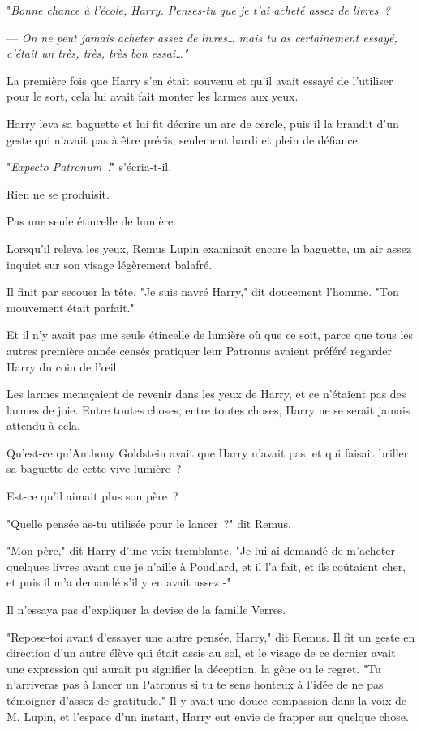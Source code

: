 "\emph{Bonne chance à l'école, Harry. Penses-tu que je t'ai acheté assez de livres~?}

--- \emph{On ne peut jamais acheter assez de livres… mais tu as certainement essayé, c'était un très, très, très bon essai…"}

La première fois que Harry s'en était souvenu et qu'il avait essayé de l'utiliser pour le sort, cela lui avait fait monter les larmes aux yeux.

Harry leva sa baguette et lui fit décrire un arc de cercle, puis il la brandit d'un geste qui n'avait pas à être précis, seulement hardi et plein de défiance.

"\emph{Expecto Patronum~!}" s'écria-t-il.

Rien ne se produisit.

Pas une seule étincelle de lumière.

Lorsqu'il releva les yeux, Remus Lupin examinait encore la baguette, un air assez inquiet sur son visage légèrement balafré.

Il finit par secouer la tête. "Je suis navré Harry," dit doucement l'homme. "Ton mouvement était parfait."

Et il n'y avait pas une seule étincelle de lumière où que ce soit, parce que tous les autres première année censés pratiquer leur Patronus avaient préféré regarder Harry du coin de l'œil.

Les larmes menaçaient de revenir dans les yeux de Harry, et ce n'étaient pas des larmes de joie. Entre toutes choses, entre toutes choses, Harry ne se serait jamais attendu à cela.

Qu'est-ce qu'Anthony Goldstein avait que Harry n'avait pas, et qui faisait briller sa baguette de cette vive lumière~?

Est-ce qu'il aimait plus son père~?

"Quelle pensée as-tu utilisée pour le lancer~?" dit Remus.

"Mon père," dit Harry d'une voix tremblante. "Je lui ai demandé de m'acheter quelques livres avant que je n'aille à Poudlard, et il l'a fait, et ils coûtaient cher, et puis il m'a demandé s'il y en avait assez -"

Il n'essaya pas d'expliquer la devise de la famille Verres.

"Repose-toi avant d'essayer une autre pensée, Harry," dit Remus. Il fit un geste en direction d'un autre élève qui était assis au sol, et le visage de ce dernier avait une expression qui aurait pu signifier la déception, la gêne ou le regret. "Tu n'arriveras pas à lancer un Patronus si tu te sens honteux à l'idée de ne pas témoigner d'assez de gratitude." Il y avait une douce compassion dans la voix de M. Lupin, et l'espace d'un instant, Harry eut envie de frapper sur quelque chose.

